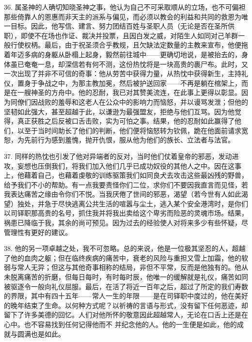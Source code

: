 36. 属圣神的人确切知晓圣神之事，他认为自己不可采取顺从的立场，也不可偏袒那些倚靠人的恩惠而非天主的派系与偏见，而必须以教会的利益和共同的救恩为唯一目标。因此，他写信、建言、努力团结百姓与圣职人员（无论是否在圣所供职），即使不在场也作证、裁决并投票，且因白发之威，对陌生人如同对己羊群一般行使权柄。最后，由于祝圣须合乎教规，且欠缺法定数量的主教来宣布，他便拖着年迈多病的身躯从卧榻上起身，毅然前往城中——更确切地说，是被抬去的，身体虽已奄奄一息，却深信若有何不测，这份热忱将是一块高贵的裹尸布。此时，又一次出现了并非不可信的奇事：他从劳苦中获得力量，从热忱中获得新生，主持礼仪，置身于争战之中，为那主教加冕，然后被护送回家——不再是躺在棺架上，而是在一艘神圣的方舟中。他的忍耐，我已对其赞美流连，在此事上更得以彰显。因为同僚们因战败的羞辱和这老人在公众中的影响力而恼怒，并以谩骂发泄；但他的坚韧如此强大，甚至超越于此，以谦逊为最强盟友，拒绝与他们互骂。因为他觉得，真正获胜之后反被口舌击败，实为可怕之事。结果，他的忍耐如此赢得了他们，以至于当时间助长了他们的判断，他们便将恼怒转为钦佩，跪在他面前请求宽恕，为先前行为感到羞愧，抛开仇恨，服从他为他们的族长、立法者与法官。\par

37. 同样的热忱也引发了他对异端者的反对，当时他们仗着皇帝的邪恶，发动进攻，妄想也压倒我们，将我们加入他们几乎已成功奴役的其他人之中。因在这事上，他藉着自己，也藉着虔敬的训练驱策我们如同良犬去攻击这些最凶残的野兽，给予我们不小的帮助。有一点我要责怪你们二位，求你们不要因我直言而见怪，若我表达痛苦之缘由令你们不悦。当我厌倦了世间的邪恶，渴望（若今世有人如此渴望）独处，并急于尽快逃离公共生活的喧嚣与尘土，逃入某个安全港湾时，是你们以司铎职那高贵的名号，抓住我并将我出卖给这个卑劣而险恶的灵魂市场。结果，祸患已降临于我，其余的尚可预见。因为过去的经验使人对将来多少有些怀疑，尽管理性有更好的建议。\par

38. 他的另一项卓越之处，我不可忽略。总的来说，他是一位极其坚忍的人，超越了他的血肉之躯；但在临终疾病的痛苦中，衰老的风险与重担又雪上加霜，他的软弱与常人无异；但这与其他奇事相称的结局，非但不平常，反而是他独有的。他从未脱离痛苦的折磨，但每日每时，有时每时辰，他唯一的缓解就是礼仪，痛苦如同被驱逐令一般向礼仪屈服。最后，在活了将近一百年之后，超过了所定的我们寿数的界限，其中有四十五年——常人一生的年限——是在司铎职中度过的，他在美好的晚年结束了生命。以何种方式呢？以祈祷的言语与形式，没有留下任何恶迹，却留下了许多美德的回忆。人们对他所怀的敬意因此超越常人，无论在口舌上还是在心中。也不容易找到任何记得他而不 并纪念他的人。他的一生便是如此，他的成就与圆满也是如此。\par

